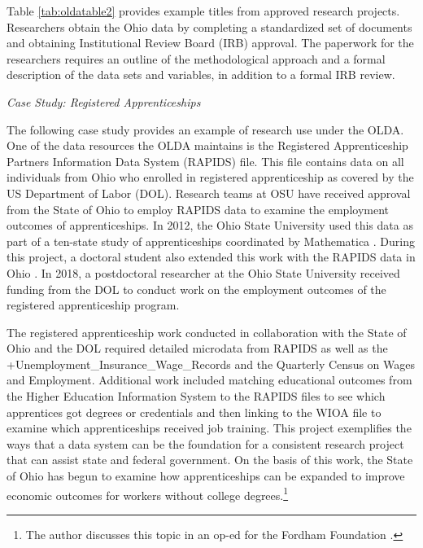\documentclass[
]{WileySix}
\begin{document}
Table \ref{tab:oldatable2} provides example titles from approved research projects. Researchers obtain the Ohio data by completing a standardized set of documents and obtaining Institutional Review Board (IRB) approval. The paperwork for the researchers requires an outline of the methodological approach and a formal description of the data sets and variables, in addition to a formal IRB review.

\emph{Case Study: Registered Apprenticeships}

The following case study provides an example of research use under the OLDA. One of the data resources the OLDA maintains is the Registered Apprenticeship Partners Information Data System (RAPIDS) file. This file contains data on all individuals from Ohio who enrolled in registered apprenticeship as covered by the US Department of Labor (DOL). Research teams at OSU have received approval from the State of Ohio to employ RAPIDS data to examine the employment outcomes of apprenticeships. In 2012, the Ohio State University used this data as part of a ten-state study of apprenticeships coordinated by Mathematica \citep{reed2012}. During this project, a doctoral student also extended this work with the RAPIDS data in Ohio \citep{hsu2013}. In 2018, a postdoctoral researcher at the Ohio State University received funding from the DOL to conduct work on the employment outcomes of the registered apprenticeship program.

The registered apprenticeship work conducted in collaboration with the State of Ohio and the DOL required detailed microdata from RAPIDS as well as the +Unemployment\_Insurance\_Wage\_Records\textbar{} and the Quarterly Census on Wages and Employment. Additional work included matching educational outcomes from the Higher Education Information System to the RAPIDS files to see which apprentices got degrees or credentials and then linking to the WIOA file to examine which apprenticeships received job training. This project exemplifies the ways that a data system can be the foundation for a consistent research project that can assist state and federal government. On the basis of this work, the State of Ohio has begun to examine how apprenticeships can be expanded to improve economic outcomes for workers without college degrees.\footnote{The author discusses this topic in an op-ed for the Fordham Foundation \citep{hawley2017a}.}
\end{document}
